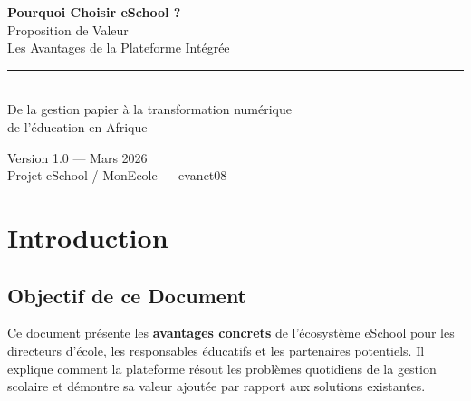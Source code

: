\documentclass[12pt,a4paper,oneside]{report}
\begin{document}
\begin{titlepage}

\vspace*{4cm}
\begin{center}
  {\Huge\bfseries\color{white} Pourquoi Choisir eSchool ?}\\[0.8cm]
  {\LARGE\color{white!90} Proposition de Valeur}\\[0.5cm]
  {\Large\color{white!80} Les Avantages de la Plateforme Intégrée}\\[3cm]
  \rule{8cm}{0.5pt}\\[0.5cm]
  {\large\color{white!85} De la gestion papier à la transformation numérique}\\
  {\large\color{white!85} de l'éducation en Afrique}\\[4.5cm]
\end{center}
\begin{center}
  {\normalsize\color{gray!80} Version 1.0 — Mars 2026}\\[0.3cm]
  {\normalsize\color{gray!80} Projet eSchool / MonEcole — evanet08}
\end{center}
\end{titlepage}

\tableofcontents
\newpage

\chapter{Introduction}

\section{Objectif de ce Document}

Ce document présente les \textbf{avantages concrets} de l'écosystème eSchool pour les directeurs d'école, les responsables éducatifs et les partenaires potentiels. Il explique comment la plateforme résout les problèmes quotidiens de la gestion scolaire et démontre sa valeur ajoutée par rapport aux solutions existantes.
\end{document}
